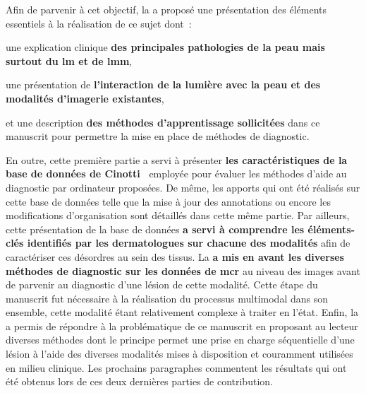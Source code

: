 Afin de parvenir à cet objectif, la  a proposé une présentation des éléments essentiels à la réalisation de ce sujet dont~:
\begin{inlinerate}
    \item une explication clinique \textbf{des principales pathologies de la peau mais surtout du \gls{lm} et de \gls{lmm}},
    \item une présentation de \textbf{l'interaction de la lumière avec la peau et des modalités d'imagerie existantes},
    \item et une description \textbf{des méthodes d'apprentissage sollicitées} dans ce manuscrit pour permettre la mise en place de méthodes de diagnostic.
\end{inlinerate} 
En outre, cette première partie a servi à présenter \textbf{les caractéristiques de la base de données de Cinotti~} employée pour évaluer les méthodes d'aide au diagnostic par ordinateur proposées. De même, les apports qui ont été réalisés sur cette base de données telle que la mise à jour des annotations ou encore les modifications d'organisation sont détaillés dans cette même partie.
Par ailleurs, cette présentation de la base de données \textbf{a servi à comprendre les éléments-clés identifiés par les dermatologues sur chacune des modalités} afin de caractériser ces désordres au sein des tissus. La  \textbf{a mis en avant les diverses méthodes de diagnostic sur les données de \gls{mcr}} au niveau des images avant de parvenir au diagnostic d'une lésion de cette modalité. Cette étape du manuscrit fut nécessaire à la réalisation du processus multimodal dans son ensemble, cette modalité étant relativement complexe à traiter en l'état. Enfin, la  a permis de répondre à la problématique de ce manuscrit en proposant au lecteur diverses méthodes dont le principe permet une prise en charge séquentielle d'une lésion à l'aide des diverses modalités mises à disposition et couramment utilisées en milieu clinique. Les prochains paragraphes commentent les résultats qui ont été obtenus lors de ces deux dernières parties de contribution.\par

